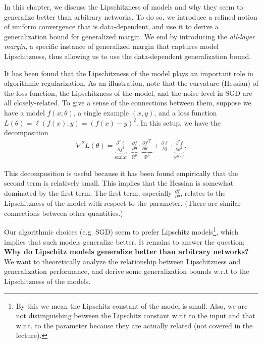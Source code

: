\setcounter{section}{0}



In this chapter, we discuss the Lipschitzness of models and why they seem to generalize better than arbitrary networks. To do so, we introduce a refined notion of uniform convergence that is data-dependent, and use it to derive a generalization bound for generalized margin. We end by introducing the \textit{all-layer margin}, a specific instance of generalized margin that captures model Lipschitzness, thus allowing us to use the data-dependent generalization bound.

 \label{sec:all_layer_margin}
It has been found that the Lipschitzness of the model plays an important role in algorithmic regularization. As an illustration, note that the curvature (Hessian) of the loss function, the Lipschitzness of the model, and the noise level in SGD are all closely-related. To give a sense of the connections between them, suppose we have a model $f(x; \theta)$, a single example $(x, y)$, and a loss function $L(\theta) = \ell (f(x), y) = (f(x) - y)^2$. In this setup, we have the decomposition
\begin{align}
\nabla^2 L(\theta) = \underbrace{{\frac{\partial^2 \ell}{\partial f^2}}}_{\text{scalar}} \cdot \underbrace{\frac{\partial f}{\partial \theta}}_{\mathbb{R}^p} \cdot \underbrace{\frac{\partial f}{\partial \theta}^\top}_{\mathbb{R}^p} + \frac{\partial \ell}{\partial f} \cdot  \underbrace{\frac{\partial^2 f}{\partial \theta^2}}_{\mathbb{R}^{p\times p}}.
\end{align}

This decomposition is useful because it has been found empirically that the second term is relatively small. This implies that the Hessian is somewhat dominated by the first term. The first term, especially $\frac{\partial  f}{\partial \theta}$, relates to the Lipschitzness of the model with respect to the parameter. (There are similar connections between other quantities.)

Our algorithmic choices (e.g. SGD) seem to prefer Lipschitz models\footnote{By this we mean the Lipschitz constant of the model is small. Also, we are not distinguishing between the Lipschitz constant w.r.t to the input and that w.r.t. to the parameter because they are actually related (not covered in the lecture).}, which implies that such models generalize better. It remains to answer the question: \textbf{Why do Lipschitz models generalize better than arbitrary networks?} We want to theoretically analyze the relationship between Lipschitzness and generalization performance, and derive some generalization bounds w.r.t to the Lipschitzness of the models.


